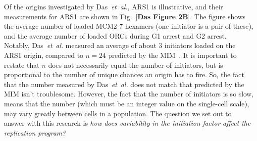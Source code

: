 		Of the origins investigated by Das~\emph{et~al.}, ARS1 is illustrative, and their measurements for ARS1 are shown in Fig.~[\textbf{Das Figure 2B}].
		The figure shows the average number of loaded MCM2-7 hexamers (one initiator is a pair of these), and the average number of loaded ORCs during G1 arrest and G2 arrest.
		Notably, Das~\emph{et~al.} measured an average of about 3 initiators loaded on the ARS1 origin, compared to $n=24$ predicted by the MIM~\cite{ScottsPaper}.
		It is important to restate that $n$ does not necessarily equal the number of initiators, but is proportional to the number of unique chances an origin has to fire.
		So, the fact that the number measured by Das~\emph{et~al.} does not match that predicted by the MIM isn't troublesome.
		However, the fact that the number of initiators is so slow, means that the number (which must be an integer value on the single-cell scale), may vary greatly between cells in a population.
		The question we set out to answer with this research is \emph{how does variability in the initiation factor affect the replication program?}










































